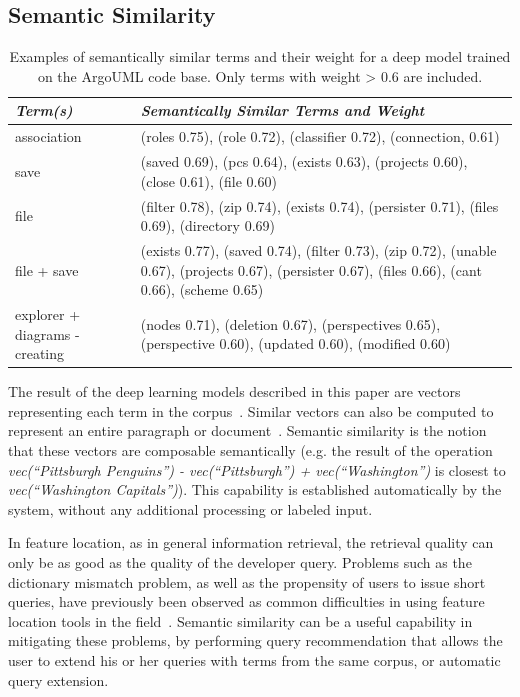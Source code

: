 \subsection{Semantic Similarity}


\begin{table}[tb]
\centering
\small
\caption{Examples of semantically similar terms and their weight for a deep model trained on
the ArgoUML code base. Only terms with weight > 0.6 are included.}
\label{tab:semsim}
\begin{tabular}{|p{}|p{}|}
\hline \hline 
{\em Term(s)} & {\em Semantically Similar Terms and Weight}\\ \hline \hline 
association & (roles 0.75), (role 0.72), (classifier 0.72), (connection, 0.61) \\ \hline
save & (saved 0.69), (pcs 0.64), (exists 0.63), (projects 0.60), (close 0.61), (file 0.60) \\ \hline
file & (filter 0.78), (zip 0.74), (exists 0.74), (persister 0.71), (files 0.69), (directory 0.69) \\ \hline
file + save & (exists 0.77), (saved 0.74), (filter 0.73), (zip 0.72), (unable 0.67), (projects 0.67), (persister 0.67), (files 0.66), (cant 0.66), (scheme 0.65) \\ \hline
explorer + diagrams - creating & (nodes 0.71), (deletion 0.67), (perspectives 0.65), (perspective 0.60), (updated 0.60), (modified 0.60)\\
\hline \hline
\end{tabular}
\end{table}


The result of the deep learning models described in this paper are
vectors representing each term in the
corpus~\cite{mikolov_distributed_2013}. Similar vectors can also be
computed to represent an entire paragraph or
document~\cite{le_distributed_2014}.  Semantic similarity is the
notion that these vectors are composable semantically (e.g. the result
of the operation {\em vec(``Pittsburgh Penguins'') - vec(``Pittsburgh'') +
vec(``Washington'')} is closest to {\em vec(``Washington Capitals'')}). This
capability is established automatically by the system, without any
additional processing or labeled input.

In feature location, as in general information retrieval, the
retrieval quality can only be as good as the quality of the developer
query. Problems such as the dictionary mismatch problem, as well as
the propensity of users to issue short queries, have previously been
observed as common difficulties in using feature location tools in the
field~\cite{haiduc_effect_2011, damevski_field_2015}. Semantic
similarity can be a useful capability in mitigating these problems, by
performing query recommendation that allows the user to extend his or
her queries with terms from the same corpus, or automatic query
extension.

